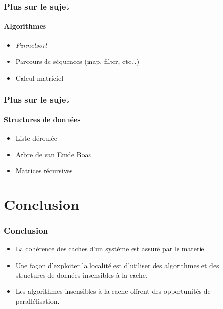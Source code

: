 \documentclass{beamer}
\begin{document}
\begin{frame}
\frametitle{Plus sur le sujet}
\framesubtitle{Algorithmes}
\begin{itemize}
\item \textit{Funnelsort}
\item Parcours de séquences (map, filter, etc...)
\item Calcul matriciel
\end{itemize}
\end{frame}

\begin{frame}
\frametitle{Plus sur le sujet}
\framesubtitle{Structures de données}
\begin{itemize}
\item Liste déroulée
\item Arbre de van Emde Boas
\item Matrices récursives
\end{itemize}
\end{frame}

\section{Conclusion}
\begin{frame}
\frametitle{Conclusion}
\begin{itemize}
\item La cohérence des caches d'un système est assuré par le matériel.
\item<2-> Une façon d'exploiter la localité est d'utiliser des algorithmes et des structures de données insensibles à la cache.
\item<3-> Les algorithmes insensibles à la cache offrent des opportunités de parallélisation.
\end{itemize}
\end{frame}
\end{document}
